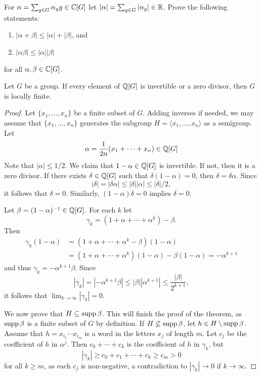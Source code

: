 \begin{exercise}
	\label{exa:norma}
	For $\alpha=\sum_{g\in G}\alpha_gg\in\mathbb{C}[G]$ let $|\alpha|=\sum_{g\in
	G}|\alpha_g|\in\mathbb{R}$. Prove the following statements:
	\begin{enumerate}
		\item $|\alpha+\beta|\leq|\alpha|+|\beta|$, and 
		\item $|\alpha\beta|\leq|\alpha||\beta|$ 
	\end{enumerate}
	for all $\alpha,\beta\in\mathbb{C}[G]$.
\end{exercise}

\begin{theorem}[Formanek]
	\label{thm:FormanekQ}
	Let $G$ be a group. If every element of $\mathbb{Q}[G]$ is invertible or 
	a zero divisor, then $G$ is locally finite. 
\end{theorem}

\begin{proof}
	Let $\{x_1,\dots,x_n\}$ be a finite subset of $G$. Adding inverses if needed, we may assume that 
	$\{x_1,\dots,x_n\}$ generates the subgroup
	$H=\langle x_1,\dots,x_n\rangle$ as a semigroup. Let 
	\[
		\alpha=\frac{1}{2n}(x_1+\cdots+x_n)\in\mathbb{Q}[G]
	\]
    Note that $|\alpha|\leq 1/2$. 
	We claim that $1-\alpha\in\mathbb{Q}[G]$ is invertible. If not, then it is a zero divisor. If there exists 
	$\delta\in\mathbb{Q}[G]$ such that $\delta(1-\alpha)=0$, then 
	$\delta=\delta\alpha$. Since  
	\[
		|\delta|=|\delta\alpha|\leq|\delta||\alpha|\leq|\delta|/2,
	\]
	it follows that $\delta=0$. Similarly, $(1-\alpha)\delta=0$ implies
	$\delta=0$. 
	
	Let $\beta=(1-\alpha)^{-1}\in\mathbb{Q}[G]$.  For each $k$ let  
	\[
		\gamma_k=(1+\alpha+\cdots+\alpha^k)-\beta.
	\]
	Then 
	\begin{align*}
		\gamma_k(1-\alpha)&=(1+\alpha+\cdots+\alpha^k-\beta)(1-\alpha)\\
		&=(1+\alpha+\cdots+\alpha^k)(1-\alpha)-\beta(1-\alpha)=-\alpha^{k+1}
	\end{align*}
	and thus  
	$\gamma_k=-\alpha^{k+1}\beta$. Since  
	\[
		|\gamma_k|=|-\alpha^{k+1}\beta|\leq|\beta||\alpha^{k+1}|\leq\frac{|\beta|}{2^{k+1}},
	\]
	it follows that $\lim_{k\to\infty}|\gamma_k|=0$. 

	We now prove that $H\subseteq\operatorname{supp}\beta$. This will finish the proof of the theorem, 
	as $\operatorname{supp}\beta$ is a finite subset of $G$ by definition. If
	$H\not\subseteq\operatorname{supp}\beta$, let $h\in H\setminus\operatorname{supp}\beta$.  Assume that 
    $h=x_{i_1}\cdots x_{i_m}$ is a word in the letters $x_j$ of length $m$. Let 
    $c_j$ be the coefficient of $h$ in $\alpha^j$. Then $c_0+\cdots+c_k$ is the 
	coefficient of $h$ in $\gamma_k$, but 
	\[
		|\gamma_k|\geq c_0+c_1+\cdots+c_k\geq c_m>0
	\]
	for all $k\geq m$, as each $c_j$ is non-negative, a contradiction to 
	$|\gamma_k|\to 0$ if $k\to\infty$.
\end{proof}

